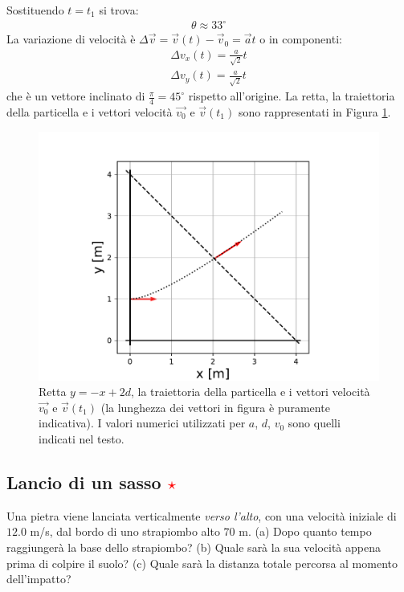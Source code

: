 \documentclass[12pt,a4paper]{book}
\newcommand{\rstar}{ \textcolor{red}{$\star$}}
\begin{document}
%
Sostituendo $t=t_1$ si trova:
%
\begin{gather*}
\theta \approx 33^\circ
\end{gather*} 
%
La variazione di velocità è $\Delta \vec{v}=\vec{v}(t)-\vec{v}_0=\vec{a}t$ o in componenti:
%
\begin{gather*}
\Delta v_x(t)=\frac{a}{\sqrt{2}}t\\
\Delta v_y(t)=\frac{a}{\sqrt{2}}t
\end{gather*} 
%
che è un vettore inclinato di $\frac{\pi}{4}=45^\circ$ rispetto all'origine. La retta, la traiettoria della particella e i vettori velocità 
$\vec{v_0}$ e $\vec{v}(t_1)$ sono rappresentati in Figura \ref{fig:particella}. 

 \begin{figure}[!ht]
 \centering
\includegraphics[scale=0.65]{particella.pdf}
\caption{Retta $y=-x+2d$, la traiettoria della particella e i vettori velocità $\vec{v_0}$ e $\vec{v}(t_1)$ (la lunghezza dei vettori in figura è puramente indicativa). I valori numerici utilizzati per $a$, $d$, $v_0$ sono quelli indicati nel testo.  \label{fig:particella} }
\end{figure}

\subsection{Lancio di un sasso \rstar}
Una pietra viene lanciata verticalmente \textit{verso l'alto}, con una velocità iniziale di $12.0$ m/s, dal bordo di uno strapiombo alto $70 $ m.
(a) Dopo quanto tempo raggiungerà la base dello strapiombo?
(b) Quale sarà la sua velocità appena prima di colpire il suolo?
(c) Quale sarà la distanza totale percorsa al momento dell'impatto?
\end{document}
